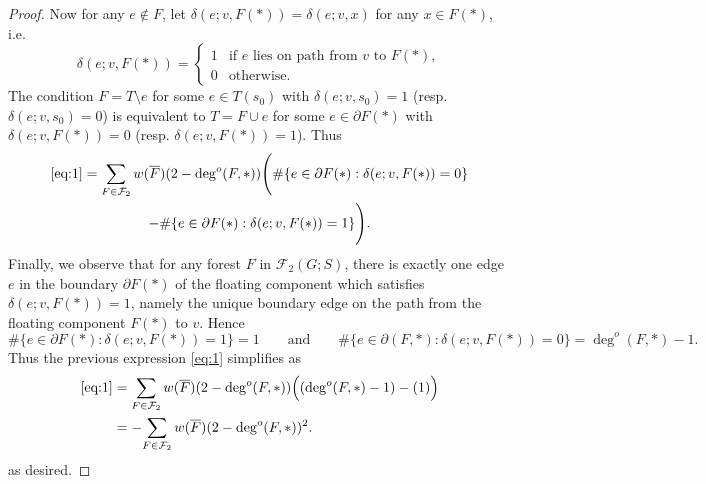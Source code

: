 \documentclass{amsart}
\theoremstyle{definition}
\newcommand{\one}{\mathds{1}}
\newcommand{\trees}{\mathcal{F}_1}
\newcommand{\forests}{\mathcal{F}}
\newcommand{\degout}{\deg^o}
\begin{document}
\begin{proof}
Now for any $e \not\in F$, let $\delta(e; v, F(*)) = \delta(e; v, x)$ for any $x \in F(*)$, i.e.
\[
	\delta(e; v, F(*)) = \begin{cases}
	1 &\text{if $e$ lies on path from $v$ to $F(*)$}, \\
	0 &\text{otherwise}.
	\end{cases}
\]
The condition $F = T \setminus e$ for some $e \in T(s_0)$ with $\delta(e; v, s_0) = 1$ (resp. $\delta(e; v, s_0) = 0$) is equivalent to $T = F \cup e$ for some $e \in \partial F(*)$ with $\delta(e; v, F(*)) = 0$ (resp. $\delta(e; v, F(*)) = 1$).
Thus
\begin{multline}
	\eqref{eq:1} = \sum_{F \in \forests_2} w(\overline{F}) (2 - \deg^o(F,*))  \Bigg( \#\{e \in \partial F(*) : \delta(e; v, F(*)) = 0 \}  \\
	- \#\{e \in \partial F(*) : \delta(e; v, F(*)) = 1 \}  \Bigg).
\end{multline}
Finally, we observe that for any forest $F$ in $\forests_2(G;S)$,
there is exactly one edge $e$ in the boundary $\partial F(*)$ of the floating component which satisfies $\delta(e; v, F(*)) = 1$, namely the unique boundary edge on the path from the floating component $F(*)$ to $v$.
Hence
\[
	\#\{e \in \partial F(*) : \delta(e;v, F(*)) = 1 \} = 1
\qquad\text{and}\qquad
	\#\{e \in \partial (F,*) : \delta(e;v, F(*)) = 0 \} = \deg^o(F,*) - 1 .
\]
Thus the previous expression \eqref{eq:1} simplifies as
\begin{align*}
	\eqref{eq:1} &= \sum_{F \in \forests_2} w(\overline{F}) (2 - \degout(F,*))  \Big( (\degout(F,*) - 1)  - (1) \Big) \\
	&= - \!\sum_{F \in \forests_2} w(\overline{F}) (2 - \degout(F,*))^2 .
\end{align*}
as desired.
\end{proof}
\end{document}

